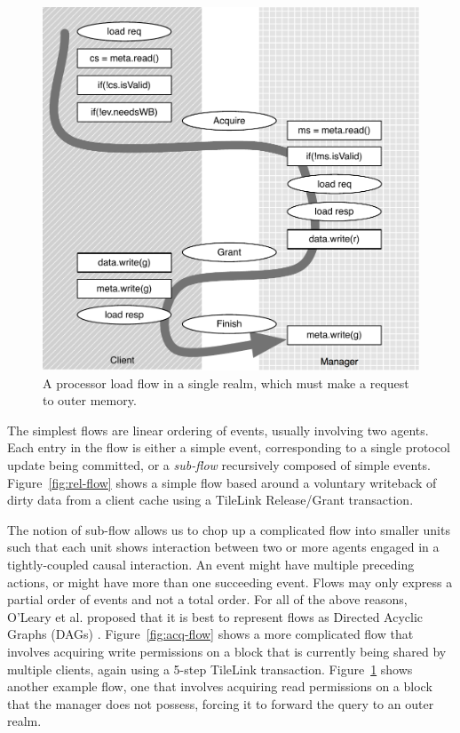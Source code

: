 \begin{figure}
\centering
\includegraphics[width=0.8\columnwidth]{coherence/figures/outer-acq-flow.pdf}
\caption[A processor load flow that misses twice.]{
A processor load flow in a single realm, which must make a request to outer memory.
}
\label{fig:outer-acq-flow}
\end{figure}

The simplest flows are linear ordering of events, usually involving two agents.
Each entry in the flow is either a simple event,
corresponding to a single protocol update being committed,
or a \emph{sub-flow} recursively composed of simple events.
Figure~\ref{fig:rel-flow} shows a simple flow based around a voluntary writeback of dirty data from a client cache
using a TileLink Release/Grant transaction.

The notion of sub-flow allows us to
chop up a complicated flow into smaller units such that each
unit shows interaction between two or more agents engaged in a tightly-coupled causal interaction.
An event might have multiple preceding actions,
or might have more than one succeeding event.
Flows may only express a partial order of events and not a total order.
For all of the above reasons, O'Leary et al. proposed that it is best to represent flows as Directed Acyclic Graphs (DAGs)
\cite{oleary-fmcad09}.
Figure~\ref{fig:acq-flow} shows a more complicated flow that involves acquiring write permissions on a block that is currently being
shared by multiple clients, again using a 5-step TileLink transaction.
Figure~\ref{fig:outer-acq-flow} shows another example flow, one that involves acquiring read permissions on a block that the manager does not possess, forcing it to forward the query to an outer realm.

